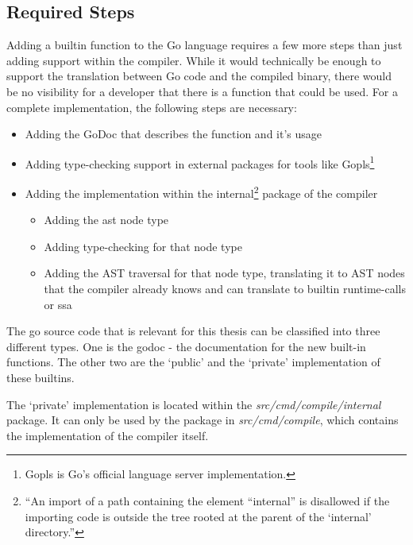 \subsection{Required Steps}

Adding a builtin function to the Go language requires a few more steps than just
adding support within the compiler. While it would technically be enough to
support the translation between Go code and the compiled binary, there would be
no visibility for a developer that there is a function that could be used.
For a complete implementation, the following steps are necessary:
\begin{itemize}
    \item Adding the GoDoc\autocite{godoc} that describes the function and it's usage
    \item Adding type-checking support in external packages for tools like
        Gopls\footnote{Gopls is Go's official language server implementation\autocite{gopls}.}
    \item Adding the implementation within the internal\footnote{
            ``An import of
            a path containing the element “internal” is disallowed if the
            importing code is outside the tree rooted at the parent of the
            `internal' directory.''\autocite{internal-packages}
        }
        package of the compiler
        \begin{itemize}
            \item Adding the \gls{ast} node type
            \item Adding type-checking for that node type
            \item Adding the AST traversal for that node type, translating it
                to AST nodes that the compiler already knows and can translate
                to builtin runtime-calls or \gls{ssa}
        \end{itemize}
\end{itemize}

The go source code that is relevant for this thesis can be classified into three different
types. One is the godoc - the documentation for the new built-in functions. The
other two are the `public' and the `private' implementation of these builtins.

The `private' implementation is located within the
\textit{src/cmd/compile/internal} package\autocite{internal-packages}. It can only
be used by the package in \textit{src/cmd/compile}, which contains the
implementation of the compiler itself.

